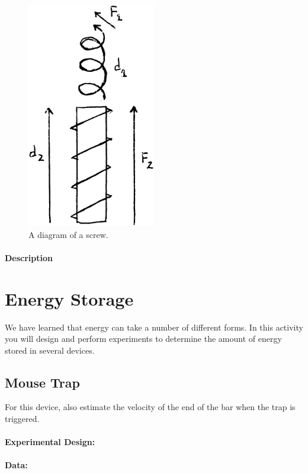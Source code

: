 \documentclass[12pt]{article}
\begin{document}
	\begin{figure}[H]
		\centerline{\includegraphics[width=0.5\textwidth]{images/screw.EPS}}
		\caption{A diagram of a screw.}
	\end{figure}
	
	\paragraph{Description}
	

	
	\section{Energy Storage}
	We have learned that energy can take a number of different forms. In this activity you will design and perform experiments to determine the amount of energy stored in several devices.

	\subsection{Mouse Trap}
	For this device, also estimate the velocity of the end of the bar when the trap is triggered.
	\paragraph{Experimental Design:}
	\paragraph{Data:}
\end{document}
